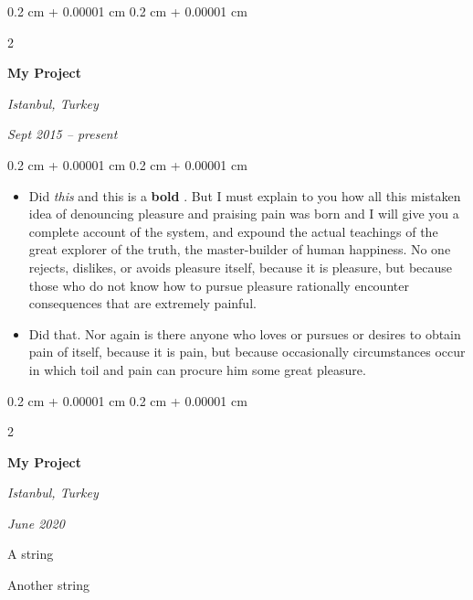 \documentclass[10pt, letterpaper]{article}
\newenvironment{summary}{
    \begin{description}[
        topsep=0.10 cm,
        parsep=0.10 cm,
        partopsep=0pt,
        itemsep=0pt,
        leftmargin=0.4 cm + 10pt
    ]
}{
    \end{description}
} %
\newenvironment{highlights}{
    \begin{itemize}[
        topsep=0.10 cm,
        parsep=0.10 cm,
        partopsep=0pt,
        itemsep=0pt,
        leftmargin=0.4 cm + 10pt
    ]
}{
    \end{itemize}
} %
\newenvironment{onecolentry}{
    \begin{adjustwidth}{
        0.2 cm + 0.00001 cm
    }{
        0.2 cm + 0.00001 cm
    }
}{
    \end{adjustwidth}
} %
\newenvironment{twocolentry}[2][]{
    \onecolentry
    \def\secondColumn{#2}
    \setcolumnwidth{\fill, 4.5 cm}
    \begin{paracol}{2}
}{
    \switchcolumn \raggedleft \secondColumn
    \end{paracol}
    \endonecolentry
} %
\let\hrefWithoutArrow\href
\renewcommand{\href}[2]{\hrefWithoutArrow{#1}{\ifthenelse{\equal{#2}{}}{ }{#2 }\raisebox{.15ex}{\footnotesize \faExternalLink*}}}
\begin{document}
        \vspace{0.2 cm}

        \begin{twocolentry}{
        \textit{Istanbul, Turkey}    
            
        \textit{Sept 2015 – present}}
            \textbf{My Project}
        \end{twocolentry}
        \vspace{0.10 cm}
        \begin{onecolentry}
            \begin{highlights}
                \item Did \textit{this} and this is a \textbf{bold} \href{https://example.com}{link}. But I must explain to you how all this mistaken idea of denouncing pleasure and praising pain was born and I will give you a complete account of the system, and expound the actual teachings of the great explorer of the truth, the master-builder of human happiness. No one rejects, dislikes, or avoids pleasure itself, because it is pleasure, but because those who do not know how to pursue pleasure rationally encounter consequences that are extremely painful.
                \item Did that. Nor again is there anyone who loves or pursues or desires to obtain pain of itself, because it is pain, but because occasionally circumstances occur in which toil and pain can procure him some great pleasure.
            \end{highlights}
        \end{onecolentry}


        \vspace{0.2 cm}

        \begin{twocolentry}{
        \textit{Istanbul, Turkey}    
            
        \textit{June 2020}}
            \textbf{My Project}
        \end{twocolentry}
            \begin{summary}
                \item A string
                \item Another string
            \end{summary}


        \vspace{0.2 cm}
\end{document}
